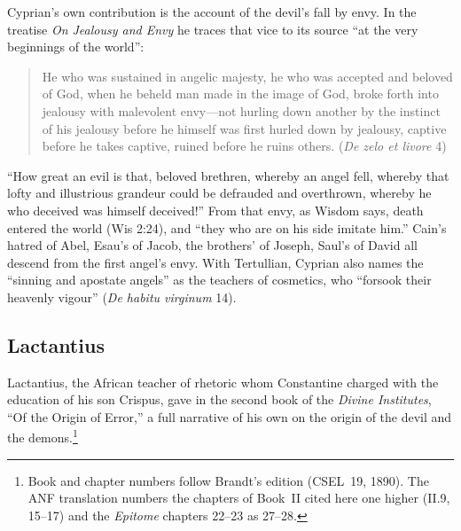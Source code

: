 Cyprian's own contribution is the account of the devil's fall by envy. In
the treatise \emph{On Jealousy and Envy} he traces that vice to its source
``at the very beginnings of the world'':
\begin{quote}
He who was sustained in angelic majesty, he who was accepted and beloved
of God, when he beheld man made in the image of God, broke forth into
jealousy with malevolent envy---not hurling down another by the instinct
of his jealousy before he himself was first hurled down by jealousy,
captive before he takes captive, ruined before he ruins others.
(\emph{De zelo et livore} 4)
\end{quote}
\noindent ``How great an evil is that, beloved brethren, whereby an angel
fell, whereby that lofty and illustrious grandeur could be defrauded and
overthrown, whereby he who deceived was himself deceived!'' From that
envy, as Wisdom says, death entered the world (Wis 2:24), and ``they who
are on his side imitate him.'' Cain's hatred of Abel, Esau's of Jacob, the
brothers' of Joseph, Saul's of David all descend from the first angel's
envy. With Tertullian, Cyprian also names the ``sinning and apostate
angels'' as the teachers of cosmetics, who ``forsook their heavenly
vigour'' (\emph{De habitu virginum} 14).

\sectionguard
\subsection{Lactantius}\label{sec:fl-lactantius}

Lactantius, the African teacher of rhetoric whom Constantine charged with
the education of his son Crispus, gave in the second book of the
\emph{Divine Institutes}, ``Of the Origin of Error,'' a full narrative of
his own on the origin of the devil and the demons.\footnote{Book and chapter numbers follow Brandt's edition (CSEL~19,
1890). The ANF translation numbers the chapters of Book~II cited here one
higher (II.9, 15--17) and the \emph{Epitome} chapters 22--23 as 27--28.}

